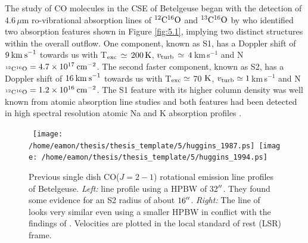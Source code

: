 The study of CO molecules in the CSE of Betelgeuse began with the detection of 4.6\,$\mu$m ro-vibrational absorption lines of $\rm{{}^{12}C^{16}O}$ and $\rm{{}^{13}C^{16}O}$ by \cite{bernat_1979} who identified two absorption features shown in Figure \ref{fig:5.1}, implying two distinct structures within the overall outflow. One component, known as S1, has a Doppler shift of $9\>{\rm km\>s}^{-1}$ towards us with T$_{\rm{exc}}\,\simeq\,200\,\rm{K}$, $v_{\rm{turb}}\,\simeq\,4$\,km\,s${}^{-1}$ and N$_{\rm{^{12}C^{16}O}}=4.7\times 10^{17}\>{\rm cm}^{-2}$. The second faster component, known as S2, has a Doppler shift of $16\>{\rm km\>s}^{-1}$ towards us with T$_{\rm{exc}} \simeq$ 70 $\rm{K}$, $v_{\rm{turb}}\simeq 1$\,km\,s${}^{-1}$ and N$_{\rm{^{12}C^{16}O}}=1.2\times 10^{16}\>{\rm cm}^{-2}$. The S1 feature with its higher column density was well known from atomic absorption line studies \citep[e.g.][]{weymann_1962} and both features had been detected in high spectral resolution atomic Na and K absorption profiles \citep{goldberg_1975}.

\begin{figure}[!ht]
\centering 
\mbox{
          \texttt{[image: /home/eamon/thesis/thesis\_template/5/huggins\_1987.ps]}
          \texttt{[image: /home/eamon/thesis/thesis\_template/5/huggins\_1994.ps]}
          }
\caption[Previous CO$J= 2-1$ rotational emission line profiles]{Previous single dish CO($J= 2-1$) rotational emission line profiles of Betelgeuse. \textit{Left:} \cite{huggins_1987} line profile using a HPBW of 32$^{\prime\prime}$. They found some evidence for an S2 radius of about $16^{\prime\prime}$. \textit{Right:} The line of \cite{huggins_1994} looks very similar even using a smaller HPBW in conflict with the findings of \cite{huggins_1987}. Velocities are plotted in the local standard of rest (LSR) frame.}
\label{fig:5.2}
\end{figure}


